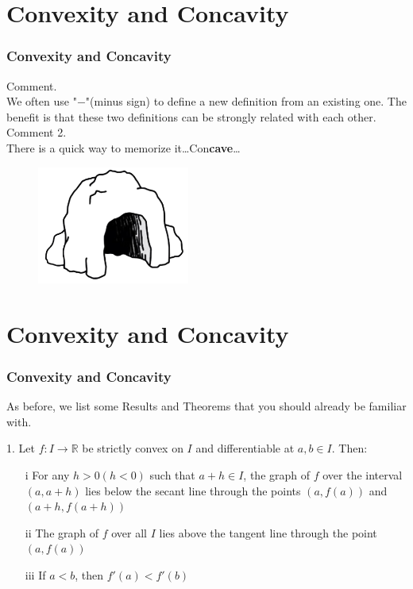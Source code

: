 \documentclass[12pt, t]{beamer}
\begin{document}
\section{Convexity and Concavity}
\begin{frame}
    \frametitle{Convexity and Concavity}
    Comment. \\
    \vspace{0.5em}
    \hspace{1em}
    We often use "$-$"(minus sign) to define a new definition from an existing one. The benefit is that these two definitions can
    be strongly related with each other.\\
    \vspace{1em}
    Comment 2.\\
    \hspace{1em}
    There is a quick way to memorize it\dots\hspace{2em}Con\textbf{cave}\dots
    \begin{figure}[H]
        \centering
        \includegraphics[width=5cm]{Figures/Concave.png}
    \end{figure}
\end{frame}


\section{Convexity and Concavity}
\begin{frame}
    \frametitle{Convexity and Concavity}
    As before, we list some Results and Theorems that you should already be familiar with.\\
    \vspace{1em}

    1. Let $f:I\rightarrow\mathbb{R}$ be strictly convex on $I$ and differentiable at $a,b\in I$. Then:
    \begin{enumerate}
        \item[i] For any $h>0(h<0)$ such that $a+h\in I$, the graph of $f$ over the interval $(a,a+h)$ lies below the secant line through the
            points $(a,f(a))$ and $(a+h, f(a+h))$
        \item[ii] The graph of $f$ over all $I$ lies above the tangent line through the point $(a, f(a))$
        \item[iii] If $a<b$, then $f'(a)<f'(b)$
    \end{enumerate}
\end{frame}
\end{document}
